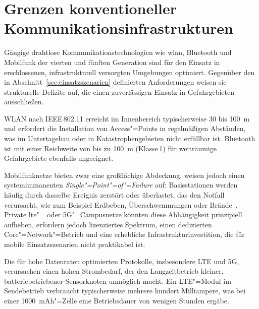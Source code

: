 \section{Grenzen konventioneller Kommunikationsinfrastrukturen}
\label{sec:komm-versagen}

Gängige drahtlose Kommunikationstechnologien wie \acrshort{wlan}, Bluetooth und
Mobilfunk der vierten und fünften Generation sind für den Einsatz in erschlossenen,
infrastrukturell versorgten Umgebungen optimiert. Gegenüber den in
Abschnitt~\ref{sec:einsatzszenarien} definierten Anforderungen weisen sie
strukturelle Defizite auf, die einen zuverlässigen Einsatz in Gefahrgebieten
ausschließen.

\begin{description}[leftmargin=*, widest=Infrastrukturabhängigkeit:, nosep]
    \item[\textbf{Reichweite:}] WLAN nach IEEE\,802.11 erreicht im
    Innenbereich typischerweise 30 bis \SI{100}{\m} und erfordert die Installation
    von Access"=Points in regelmäßigen Abständen, was im 
    Untertagebau oder in Katastrophengebieten nicht erfüllbar ist. Bluetooth ist
    mit einer Reichweite von bis zu \SI{100}{\m} (Klasse\,1) für weiträumige
    Gefahrgebiete ebenfalls ungeeignet.

    \item[\textbf{Infrastrukturabhängigkeit:}] Mobilfunknetze bieten zwar eine
    großflächige Abdeckung, weisen jedoch einen systemimmanenten
    \textit{Single"=Point"=of"=Failure} auf: Basisstationen werden häufig durch
    dasselbe Ereignis zerstört oder überlastet, das den Notfall verursacht, wie zum Beispiel
    Erdbeben, Überschwemmungen oder Brände~\cite{sciulloDesignPerformanceEvaluation2020}. Private %
    \acrshort{lte}"= oder 5G"=Campusnetze könnten diese Abhängigkeit prinzipiell
    aufheben, erfordern jedoch lizenziertes Spektrum, einen dedizierten
    Core"=Network"=Betrieb und eine erhebliche Infrastrukturinvestition, die
    für mobile Einsatzszenarien nicht praktikabel ist.

    \item[\textbf{Energieverbrauch:}] Die für hohe Datenraten optimierten
    Protokolle, insbesondere LTE und 5G, verursachen einen hohen
    Strombedarf, der den Langzeitbetrieb kleiner, batteriebetriebener Sensorknoten
    unmöglich macht. Ein LTE"=Modul im Sendebetrieb verbraucht typischerweise
    mehrere hundert Milliampere, was bei einer \SI{1000}{mAh}"=Zelle eine Betriebsdauer von wenigen Stunden ergäbe.
\end{description}

